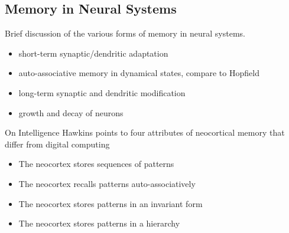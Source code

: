 \subsection{\label{sec:memory}Memory in Neural Systems}

Brief discussion of the various forms of memory in neural systems.
\begin{itemize}
\item short-term synaptic/dendritic adaptation
\item auto-associative memory in dynamical states, compare to Hopfield
\item long-term synaptic and dendritic modification
\item growth and decay of neurons
\end{itemize}

On Intelligence
\cite{ha2004}
Hawkins points to four attributes of neocortical memory that differ from digital computing
\begin{itemize}
\item The neocortex stores sequences of patterns
\item The neocortex recalls patterns auto-associatively
\item The neocortex stores patterns in an invariant form
\item The neocortex stores patterns in a hierarchy
\end{itemize}
